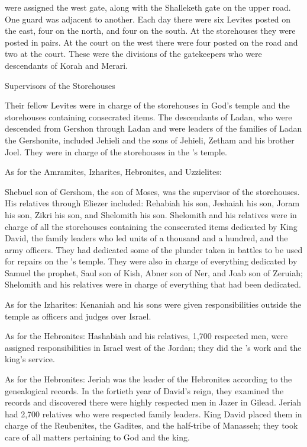 {were assigned the west
gate,
along with
the Shalleketh
gate on the upper road. One guard was adjacent to another.
Each day
there were six
Levites
posted on the east,
four
on the north,
and four
on the south.
At the storehouses
they were posted in pairs.
At the court
on the west
there were four
posted on the road
and two
at the court.
These
were the divisions
of the gatekeepers
who were descendants
of Korah
and Merari.
\par }{\SH Supervisors of the Storehouses
\par }{\PP {}Their fellow Levites
were in charge
of the storehouses
in God’s
temple
and the storehouses
containing consecrated items.
The descendants
of Ladan,
who were descended
from Gershon
through Ladan
and were leaders
of the families
of Ladan
the Gershonite,
included Jehieli
and the sons
of Jehieli,
Zetham
and his brother
Joel.
They were in charge
of the storehouses
in the
{}’s
temple.
\par }{\PP {}As for the Amramites,
Izharites,
Hebronites,
and Uzzielites:
\par }{\PP {}Shebuel
son
of Gershom,
the son
of Moses,
was the supervisor
of the storehouses.
His relatives
through Eliezer
included: Rehabiah
his son,
Jeshaiah
his son,
Joram
his son,
Zikri
his son,
and Shelomith
his son.
Shelomith
and his relatives
were in charge of
all
the storehouses
containing the consecrated items
dedicated
by King
David,
the family
leaders
who led units
of a thousand
and a hundred,
and the army
officers.
They had dedicated
some
of the plunder
taken in battles
to be used for repairs
on the
{}’s
temple.
They were also in charge of everything
dedicated
by Samuel
the prophet,
Saul
son
of Kish,
Abner
son
of Ner,
and Joab
son
of Zeruiah;
Shelomith
and
his relatives
were in charge of everything
that had been dedicated.
\par }{\PP {}As for the Izharites: Kenaniah
and his sons
were given responsibilities
outside
the temple as officers
and judges
over
Israel.
\par }{\PP {}As for the Hebronites: Hashabiah
and his relatives,
1,700
respected men,
were assigned responsibilities
in
Israel
west
of the Jordan;
they did the
{}’s
work
and the king’s
service.
\par }{\PP {}As for the Hebronites: Jeriah
was the leader
of the Hebronites
according to the genealogical records.
In the fortieth
year
of David’s
reign,
they examined
the records and discovered
there were highly
respected men
in Jazer
in Gilead.
Jeriah had 2,700
relatives
who were respected
family
leaders.
King
David
placed them in
charge of the Reubenites,
the Gadites,
and the half-tribe
of Manasseh;
they took care of all
matters pertaining
to God
and the king.

}
